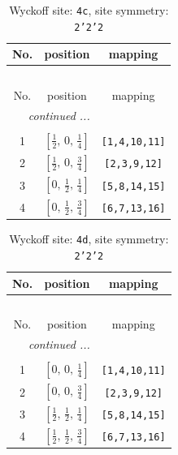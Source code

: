 \documentclass[fleqn,8pt]{jsarticle}
\begin{document}
\renewcommand{\arraystretch}{1.2}
\begin{longtable}{ccc}
\caption{Wyckoff site: {\tt 4c}, site symmetry: {\tt 2'2'2}}
 \\
 \hline \hline
No. & position & mapping \\ \hline \endfirsthead

\multicolumn{2}{l}{\tablename\ \thetable{}} \\
 \hline \hline
No. & position & mapping \\ \hline \endhead

 \hline \hline
\multicolumn{2}{r}{\footnotesize\it continued ...} \\ \endfoot

 \hline \hline
\multicolumn{2}{r}{} \\ \endlastfoot

1 & $\left[ \frac{1}{2},\, 0,\, \frac{1}{4} \right]$ & {\tt [1,4,10,11]} \\ \hline
2 & $\left[ \frac{1}{2},\, 0,\, \frac{3}{4} \right]$ & {\tt [2,3,9,12]} \\ \hline
3 & $\left[ 0,\, \frac{1}{2},\, \frac{1}{4} \right]$ & {\tt [5,8,14,15]} \\ \hline
4 & $\left[ 0,\, \frac{1}{2},\, \frac{3}{4} \right]$ & {\tt [6,7,13,16]} \\
\end{longtable}
\renewcommand{\arraystretch}{1.2}
\begin{longtable}{ccc}
\caption{Wyckoff site: {\tt 4d}, site symmetry: {\tt 2'2'2}}
 \\
 \hline \hline
No. & position & mapping \\ \hline \endfirsthead

\multicolumn{2}{l}{\tablename\ \thetable{}} \\
 \hline \hline
No. & position & mapping \\ \hline \endhead

 \hline \hline
\multicolumn{2}{r}{\footnotesize\it continued ...} \\ \endfoot

 \hline \hline
\multicolumn{2}{r}{} \\ \endlastfoot

1 & $\left[ 0,\, 0,\, \frac{1}{4} \right]$ & {\tt [1,4,10,11]} \\ \hline
2 & $\left[ 0,\, 0,\, \frac{3}{4} \right]$ & {\tt [2,3,9,12]} \\ \hline
3 & $\left[ \frac{1}{2},\, \frac{1}{2},\, \frac{1}{4} \right]$ & {\tt [5,8,14,15]} \\ \hline
4 & $\left[ \frac{1}{2},\, \frac{1}{2},\, \frac{3}{4} \right]$ & {\tt [6,7,13,16]} \\
\end{longtable}
\end{document}
